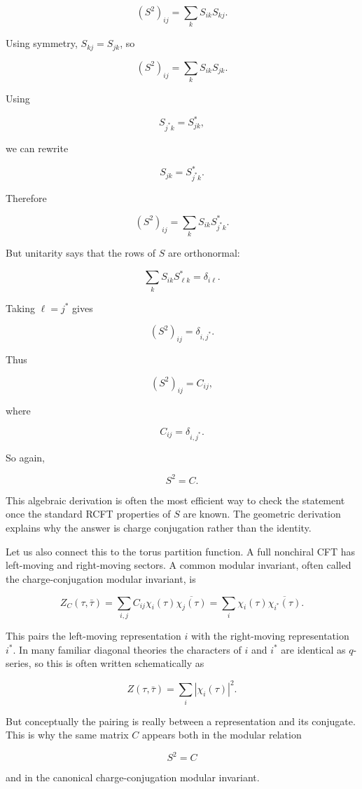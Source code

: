 \documentclass[
  10pt,
  a4paper,
  openany]{book}
\begin{document}
\[
(S^2)_{ij}
=
\sum_k S_{ik}S_{kj}.
\]

Using symmetry, \(S_{kj}=S_{jk}\), so

\[
(S^2)_{ij}
=
\sum_k S_{ik}S_{jk}.
\]

Using

\[
S_{j^*k}=S_{jk}^*,
\]

we can rewrite

\[
S_{jk}=S_{j^*k}^*.
\]

Therefore

\[
(S^2)_{ij}
=
\sum_k S_{ik}S_{j^*k}^*.
\]

But unitarity says that the rows of \(S\) are orthonormal:

\[
\sum_k S_{ik}S_{\ell k}^*
=
\delta_{i\ell}.
\]

Taking \(\ell=j^*\) gives

\[
(S^2)_{ij}
=
\delta_{i,j^*}.
\]

Thus

\[
(S^2)_{ij}
=
C_{ij},
\]

where

\[
C_{ij}
=
\delta_{i,j^*}.
\]

So again,

\[
S^2=C.
\]

This algebraic derivation is often the most efficient way to check the
statement once the standard RCFT properties of \(S\) are known. The
geometric derivation explains why the answer is charge conjugation
rather than the identity.

Let us also connect this to the torus partition function. A full
nonchiral CFT has left-moving and right-moving sectors. A common modular
invariant, often called the charge-conjugation modular invariant, is

\[
Z_C(\tau,\bar\tau)
=
\sum_{i,j} C_{ij}\chi_i(\tau)\overline{\chi_j(\tau)}
=
\sum_i \chi_i(\tau)\overline{\chi_{i^*}(\tau)}.
\]

This pairs the left-moving representation \(i\) with the right-moving
representation \(i^*\). In many familiar diagonal theories the
characters of \(i\) and \(i^*\) are identical as \(q\)-series, so this
is often written schematically as

\[
Z(\tau,\bar\tau)
=
\sum_i |\chi_i(\tau)|^2.
\]

But conceptually the pairing is really between a representation and its
conjugate. This is why the same matrix \(C\) appears both in the modular
relation

\[
S^2=C
\]

and in the canonical charge-conjugation modular invariant.
\end{document}

